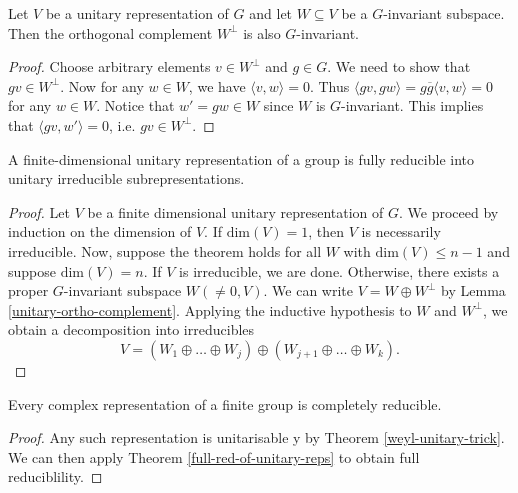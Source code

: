 \begin{lemma}\label{unitary-ortho-complement}
Let $V$ be a unitary representation of $G$ and let $W \subseteq V$ be a $G$-invariant subspace.  Then the orthogonal complement $W^\perp$ is also $G$-invariant.
\end{lemma}
\begin{proof}
Choose arbitrary elements $v \in W^\perp$ and $g \in G$.  We need to show that $gv \in W^\perp$.  Now for any $w \in W$, we have $\langle v,w \rangle = 0$.  Thus $\langle gv, gw \rangle = g \overline{g} \langle v , w \rangle = 0$ for any $w \in W$.  Notice that $w' = gw \in W$ since $W$ is $G$-invariant.  This implies that $ \langle gv, w' \rangle =0$, i.e. $gv \in W^\perp$.
\end{proof}


\begin{thm}\label{full-red-of-unitary-reps}
A finite-dimensional unitary representation of a group is fully reducible into unitary irreducible subrepresentations.
\end{thm}
\begin{proof}
Let $V$ be a finite dimensional unitary representation of $G$. We proceed by induction on the dimension of $V$.  If $\text{dim}(V)=1$, then $V$ is necessarily irreducible.  Now, suppose the theorem holds for all $W$ with $\text{dim}(V) \leq n - 1$ and suppose $\text{dim}(V)=n$. If $V$ is irreducible, we are done. Otherwise, there exists a proper $G$-invariant subspace $W (\neq 0, V)$.  
We can write $V = W \oplus W^\perp$ by Lemma \ref{unitary-ortho-complement}.  Applying the inductive hypothesis to $W$ and $W^\perp$, we obtain a decomposition into irreducibles
\[ V = (W_1 \oplus \ldots \oplus W_j) \oplus (W_{j + 1} \oplus \ldots \oplus W_k). \]
\end{proof}

\begin{cor}
Every complex representation of a finite group is completely reducible.
\end{cor}
\begin{proof}
Any such representation is unitarisable y by Theorem \ref{weyl-unitary-trick}.  We can then apply Theorem \ref{full-red-of-unitary-reps} to obtain full reduciblility.
\end{proof}


